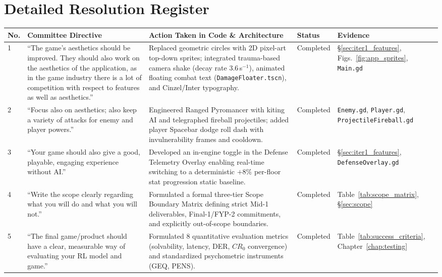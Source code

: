 \section*{Detailed Resolution Register}
\begin{longtable}{p{}p{}p{}p{}p{}}
\toprule
\textbf{No.} & \textbf{Committee Directive} & \textbf{Action Taken in Code \& Architecture} & \textbf{Status} & \textbf{Evidence} \\
\midrule
1 & ``The game's aesthetics should be improved. They should also work on the aesthetics of the application, as in the game industry there is a lot of competition with respect to features as well as aesthetics.'' & Replaced geometric circles with 2D pixel-art top-down sprites; integrated trauma-based camera shake (decay rate $3.6$\,s$^{-1}$), animated floating combat text (\texttt{DamageFloater.tscn}), and Cinzel/Inter typography. & Completed & §\ref{sec:iter1_features}, Figs.~\ref{fig:app_sprites}, \texttt{Main.gd} \\
\midrule
2 & ``Focus also on aesthetics; also keep a variety of attacks for enemy and player powers.'' & Engineered Ranged Pyromancer with kiting AI and telegraphed fireball projectiles; added player Spacebar dodge roll dash with invulnerability frames and cooldown. & Completed & \texttt{Enemy.gd}, \texttt{Player.gd}, \texttt{ProjectileFireball.gd} \\
\midrule
3 & ``Your game should also give a good, playable, engaging experience without AI.'' & Developed an in-engine toggle in the Defense Telemetry Overlay enabling real-time switching to a deterministic $+8\%$ per-floor stat progression static baseline. & Completed & §\ref{sec:iter1_features}, \texttt{DefenseOverlay.gd} \\
\midrule
4 & ``Write the scope clearly regarding what you will do and what you will not.'' & Formulated a formal three-tier Scope Boundary Matrix defining strict Mid-1 deliverables, Final-1/FYP-2 commitments, and explicitly out-of-scope boundaries. & Completed & Table~\ref{tab:scope_matrix}, §\ref{sec:scope} \\
\midrule
5 & ``The final game/product should have a clear, measurable way of evaluating your RL model and game.'' & Formulated 8 quantitative evaluation metrics (solvability, latency, DER, $CR_0$ convergence) and standardized psychometric instruments (GEQ, PENS). & Completed & Table~\ref{tab:success_criteria}, Chapter~\ref{chap:testing} \\
\midrule

\end{longtable}
